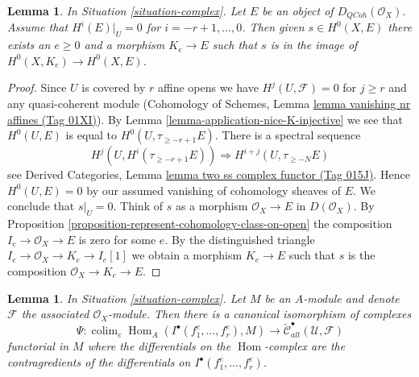 \documentclass{amsart}
\theoremstyle{plain}
\newtheorem{lemma}[subsection]{Lemma}
\theoremstyle{definition}
\theoremstyle{remark}
\numberwithin{equation}{subsection}
\def\colim{\mathop{\mathrm{colim}}\nolimits}
\def\Hom{\mathop{\mathrm{Hom}}\nolimits}
\def\QCoh{\mathit{QCoh}}
\begin{document}
\begin{lemma}
\label{lemma-represent-cohomology-class-on-closed}
In Situation \ref{situation-complex}. Let $E$ be an object of
$D_\QCoh(\mathcal{O}_X)$.
Assume that $H^i(E)|_U = 0$ for $i = - r + 1, \ldots, 0$.
Then given $s \in H^0(X, E)$ there exists an $e \geq 0$ and
a morphism $K_e \to E$ such that $s$ is in the image of
$H^0(X, K_e) \to H^0(X, E)$.
\end{lemma}

\begin{proof}
Since $U$ is covered by $r$ affine opens we have $H^j(U, \mathcal{F}) = 0$
for $j \geq r$ and any quasi-coherent module
(Cohomology of Schemes, Lemma \href{https://stacks.math.columbia.edu/tag/01XI}{lemma vanishing nr affines (Tag 01XI)}).
By Lemma \ref{lemma-application-nice-K-injective} we see that $H^0(U, E)$
is equal to $H^0(U, \tau_{\geq -r + 1}E)$. There is
a spectral sequence
$$
H^j(U, H^i(\tau_{\geq -r + 1}E)) \Rightarrow H^{i + j}(U, \tau_{\geq -N}E)
$$
see Derived Categories, Lemma \href{https://stacks.math.columbia.edu/tag/015J}{lemma two ss complex functor (Tag 015J)}.
Hence $H^0(U, E) = 0$ by our assumed vanishing of cohomology sheaves of $E$.
We conclude that $s|_U = 0$.
Think of $s$ as a morphism $\mathcal{O}_X \to E$ in $D(\mathcal{O}_X)$.
By Proposition \ref{proposition-represent-cohomology-class-on-open}
the composition $I_e \to \mathcal{O}_X \to E$ is zero for some $e$.
By the distinguished triangle $I_e \to \mathcal{O}_X \to K_e \to I_e[1]$
we obtain a morphism $K_e \to E$ such that $s$ is the composition
$\mathcal{O}_X \to K_e \to E$.
\end{proof}


\begin{lemma}
\label{lemma-alternating-cech-complex}
In Situation \ref{situation-complex}. Let $M$ be an $A$-module and
denote $\mathcal{F}$ the associated $\mathcal{O}_X$-module. Then
there is a canonical isomorphism of complexes
$$
\Psi : \colim_e \Hom_A(I^\bullet(f_1^e, \ldots, f_r^e), M)
\longrightarrow
\check{\mathcal{C}}_{alt}^\bullet(\mathcal{U}, \mathcal{F})
$$
functorial in $M$ where the differentials on the $\Hom$-complex
are the contragredients of the differentials on
$I^\bullet(f_1^e, \ldots, f_r^e)$.
\end{lemma}
\end{document}
